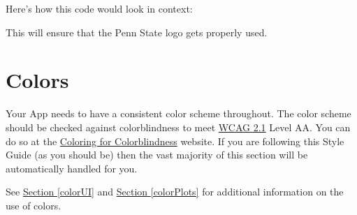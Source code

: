 \documentclass[
]{book}
\newenvironment{Shaded}{\begin{snugshade}}{\end{snugshade}}
\newcommand{\CommentTok}[1]{\textcolor[rgb]{0.56,0.35,0.01}{\textit{#1}}}
\newcommand{\DataTypeTok}[1]{\textcolor[rgb]{0.13,0.29,0.53}{#1}}
\newcommand{\DecValTok}[1]{\textcolor[rgb]{0.00,0.00,0.81}{#1}}
\newcommand{\KeywordTok}[1]{\textcolor[rgb]{0.13,0.29,0.53}{\textbf{#1}}}
\newcommand{\NormalTok}[1]{#1}
\newcommand{\OperatorTok}[1]{\textcolor[rgb]{0.81,0.36,0.00}{\textbf{#1}}}
\newcommand{\StringTok}[1]{\textcolor[rgb]{0.31,0.60,0.02}{#1}}
\begin{document}
Here's how this code would look in context:

\begin{Shaded}
\end{Shaded}

This will ensure that the Penn State logo gets properly used.

\hypertarget{colors-1}{%
\section{Colors}\label{colors-1}}

Your App needs to have a consistent color scheme throughout. The color scheme should be checked against colorblindness to meet \href{https://www.w3.org/WAI/WCAG21/quickref/}{WCAG 2.1} Level AA. You can do so at the \href{https://davidmathlogic.com/colorblind/\#\%23000000-\%23E69F00-\%2356B4E9-\%23009E73-\%23F0E442-\%230072B2-\%23D55E00-\%23CC79A7}{Coloring for Colorblindness} website. If you are following this Style Guide (as you should be) then the vast majority of this section will be automatically handled for you.

See \protect\hyperlink{colorUI}{Section \ref{colorUI}} and \protect\hyperlink{colorPlots}{Section \ref{colorPlots}} for additional information on the use of colors.
\end{document}
